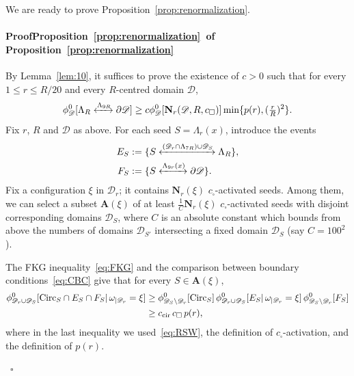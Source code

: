 \documentclass[a4paper,oneside,11pt]{article}
\numberwithin{equation}{section}
\numberwithin{equation}{section}
\numberwithin{equation}{section}
\newenvironment{proof}[1][\relax]%
  {\paragraph{Proof\ifx#1\relax\else~of #1\fi}}%
  {~\hfill$\square$\par\bigskip}
\newcommand{\calD}{\mathcal{D}}
\newcommand{\La}{\Lambda}
\newcommand{\im}[1]{{\textcolor{blue}{[IM: #1\marginpar{\textcolor{blue}{\bf $\bigstar$}}]}}}
\newcommand{\Circ}{\mathrm{Circ}}
\begin{document}
We are ready to prove Proposition~\ref{prop:renormalization}.
\begin{proof}[Proposition~\ref{prop:renormalization}]
By Lemma~\ref{lem:10}, it suffices to prove the existence of $c > 0$ 
such that for every $1\le r\le R/20$ and every $R$-centred domain $\calD$,
\begin{equation}\label{eq:ai1}
	\phi_\calD^0 [\Lambda_R\xleftrightarrow{\Lambda_{9R}} \partial\calD]
	\ge c \phi_\calD^0[\mathbf N_r(\calD,R,c_\square)]\min\{p(r),(\tfrac rR)^2\}.
\end{equation}
Fix $r$, $R$ and $\calD$ as above. For each seed $S=\Lambda_r(x)$, introduce the events
\begin{align*}
E_S&:=\{S\xleftrightarrow{(\calD_r\cap\Lambda_{7R})\cup\calD_S}\Lambda_R\},\\
F_S&:=\{S\xleftrightarrow{\Lambda_{9r}(x)}\partial\calD\}. \end{align*}
Fix a configuration $\xi$ in $\calD_r$; it contains $\mathbf N_r(\xi)$ $c_\square$-activated seeds. Among them, we can select a subset  $\mathbf A(\xi)$ of at least $\frac 1 C \mathbf N_r(\xi)$  $c_\square$-activated seeds with disjoint corresponding domains $\mathcal D_S$, where $C$ is an absolute constant which bounds from above  the numbers of domains $\mathcal D_{S'}$  intersecting a fixed domain $\mathcal D_S$ (say $C=100^2$).


The FKG inequality~\eqref{eq:FKG} and the comparison between boundary conditions~\eqref{eq:CBC} give that for every $S\in \mathbf A(\xi)$,
\begin{align}
\phi_{\calD_r \cup \calD_S}^0[\Circ_S\cap E_S\cap F_S|\, \omega_{|\calD_r}=\xi]
& \ge \phi_{\calD_S\setminus \calD_r}^0[\Circ_S]\, \phi_{\calD_r\cup\calD_S}^0[E_S|\,\omega_{|\calD_r}=\xi]\, \phi_{\calD_S\setminus \calD_r}^0[F_S] \nonumber\\
& \ge c_{\rm cir}\,c_\square\, p(r),
\label{eq:renorm11}
\end{align}
where in the last inequality we used~\eqref{eq:RSW}, the definition of $c_\square$-activation, and the definition of $p(r)$.


\end{proof}
\end{document}

